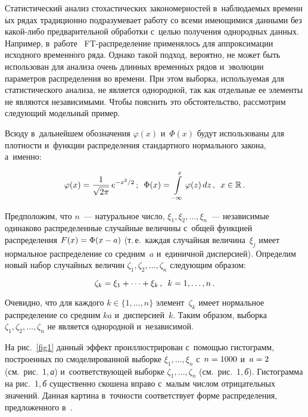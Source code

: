 \begin{multicols}{2}
Статистический анализ стохастических закономерностей 
в~наблюдаемых временн$\acute{\mbox{ы}}$х рядах традиционно подразумевает работу
со всеми име\-ющи\-мися данными без ка\-кой-ли\-бо предварительной\linebreak
обработки с~целью получения однородных данных. Например, 
в~работе~\cite{Gulev2012} FT-рас\-пре\-де\-ле\-ние применялось для
аппроксимации исходного временн$\acute{\mbox{о}}$го ряда. Однако такой подход,
вероятно, не может быть использован для анализа очень длинных
временн$\acute{\mbox{ы}}$х рядов и~эволюции параметров распределения во времени.
При этом выборка, используемая для статистического анализа, не
является однородной, так как отдельные ее элементы не являются
независимыми. Чтобы пояснить это обстоятельство, рассмотрим
следующий модельный пример.

Всюду в~дальнейшем обозначения $\varphi(x)$ и~$\Phi(x)$ будут
использованы для плотности и~функции распределения стандартного
нормального закона, а~именно:

\noindent
\begin{equation*}
\varphi(x)=\displaystyle\frac{\displaystyle 1\mathstrut}{\displaystyle \sqrt{2\pi}\mathstrut}\,e^{-x^2/2}\,;\enskip
\Phi(x)=\int\limits_{-\infty}^{x}\varphi(z)\,dz\,,\enskip x\in\mathbb{R}\,.
\end{equation*}

Предположим, что $n$~--- натуральное число,
$\xi_1,\xi_2,\ldots,\xi_n$~--- независимые одинаково распределенные
случайные величины с~общей функцией распределения
$F(x)\hm=\Phi(x\hm-a)$
(т.\,е.\ каждая случайная величина~$\xi_j$ имеет нормальное
распределение со средним~$a$ и~единичной дисперсией). Определим
новый набор случайных величин $\zeta_1,\zeta_2,\ldots,\zeta_n$
следующим образом:

\vspace*{2pt}

\noindent
\begin{equation*}
\zeta_k=\xi_1+\cdots+\xi_k\,,\enskip k=1,\ldots,n\,.
\end{equation*}

\vspace*{-2pt}

Очевидно, что для каждого $k\in\{1,\ldots,n\}$ элемент~$\zeta_k$
имеет нормальное распределение со средним $ka$ и~дисперсией~$k$.
Таким образом, выборка $\zeta_1,\zeta_2,\ldots,\zeta_n$ не является
однородной и~независимой.

На рис.~\ref{fig1} данный эффект проиллюстрирован с~помощью
гистограмм, построенных по смоделированной выборке
$\xi_1,\ldots,\xi_n$  с~$n\hm=1000$ и~$a\hm=2$ (см.\ рис.~1,\,\textit{а}) 
и~соответствующей выборке $\zeta_1,\ldots,\zeta_n$ (см.\ рис.~1,\,\textit{б}). 
Гистограмма на рис.~1,\,\textit{б} существенно скошена вправо с~малым
числом отрицательных значений. Данная картина в~точности
соответствует форме распределения, предложенного в~\cite{Gulev2012}.



\end{multicols}
